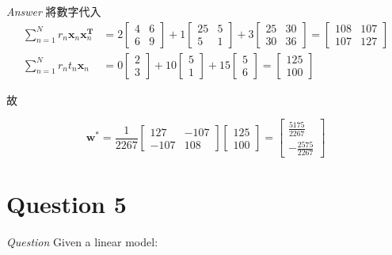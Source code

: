 \documentclass{article}
\begin{document}
\emph{Answer} 將數字代入
\begin{equation}
\begin{aligned}
\sum\limits_{n=1}^N r_n \mathbf x_n \mathbf x_n^{\mathbf T}
&=2\begin{bmatrix}
4 & 6 \\
6 & 9
\end{bmatrix}+1\begin{bmatrix}
25 & 5\\
5 & 1
\end{bmatrix}+3\begin{bmatrix}
25 & 30 \\
30 & 36
\end{bmatrix}=\begin{bmatrix}
108 & 107\\
107 & 127
\end{bmatrix}\\
\sum\limits_{n=1}^N r_n t_n \mathbf x_n
&=0\begin{bmatrix}
2\\3
\end{bmatrix}+10\begin{bmatrix}
5\\1
\end{bmatrix}+15\begin{bmatrix}
5\\6
\end{bmatrix}=\begin{bmatrix}
125\\100
\end{bmatrix}
\end{aligned}
\end{equation}

故

\begin{equation}
\mathbf w^*=\frac{1}{2267}\begin{bmatrix}
127 & -107\\
-107 & 108
\end{bmatrix}\begin{bmatrix}
125\\100
\end{bmatrix}=\begin{bmatrix}
\frac{5175}{2267}\\-\frac{2575}{2267}
\end{bmatrix}
\end{equation}

\section{Question 5}
\emph{Question} Given a linear model:
\end{document}
